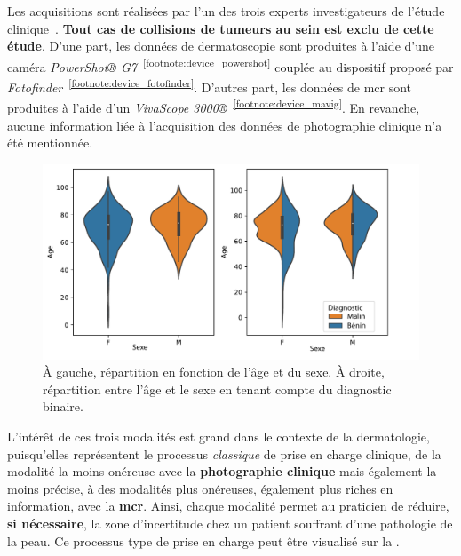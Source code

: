 Les acquisitions sont réalisées par l'un des trois experts investigateurs de l'étude clinique~\cite{Cinotti2018}. \textbf{Tout cas de collisions de tumeurs au sein est exclu de cette étude}. D'une part, les données de dermatoscopie sont produites à l'aide d'une caméra \textit{PowerShot® G7}~\textsuperscript{\ref{footnote:device_powershot}} couplée au dispositif proposé par \textit{Fotofinder}~\textsuperscript{\ref{footnote:device_fotofinder}}. D'autres part, les données de \gls{mcr} sont produites à l'aide d'un \textit{VivaScope 3000®}~\textsuperscript{\ref{footnote:device_mavig}}. En revanche, aucune information liée à l'acquisition des données de photographie clinique n'a été mentionnée.\par

\begin{figure}[H]
    \centering
    \includegraphics[width=\linewidth]{contents/chapter_4/resources/statistics_age_sex.pdf}
    \caption{À gauche, répartition en fonction de l'âge et du sexe. À droite, répartition entre l'âge et le sexe en tenant compte du diagnostic binaire.}
    \label{fig:statistics_age_sex}
\end{figure}\par

L'intérêt de ces trois modalités est grand dans le contexte de la dermatologie, puisqu'elles représentent le processus \textit{classique} de prise en charge clinique, de la modalité la moins onéreuse avec la \textbf{photographie clinique} mais également la moins précise, à des modalités plus onéreuses, également plus riches en information, avec la \textbf{\gls{mcr}}. Ainsi, chaque modalité permet au praticien de réduire, \textbf{si nécessaire}, la zone d'incertitude chez un patient souffrant d'une pathologie de la peau. Ce processus type de prise en charge peut être visualisé sur la .\par

